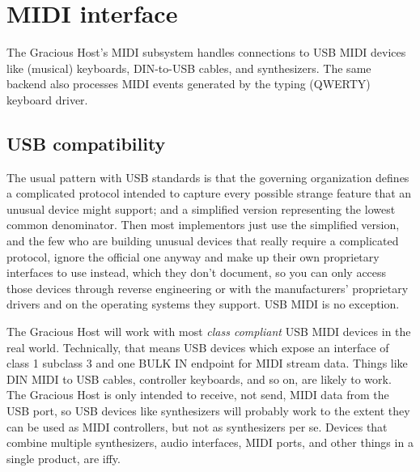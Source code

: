 
%
%
%
%
%
%

\chapter{MIDI interface}

The Gracious Host's MIDI subsystem handles connections to USB MIDI devices
like (musical) keyboards, DIN-to-USB cables, and synthesizers.  The same
backend also processes MIDI events generated by the typing (QWERTY) keyboard
driver.


\section{USB compatibility}

The usual pattern with USB standards is that the governing organization
defines a complicated protocol intended to capture every possible strange
feature that an unusual device might support; and a simplified version
representing the lowest common denominator.  Then most implementors just use
the simplified version, and the few who are building unusual devices that
really require a complicated protocol, ignore the official one anyway and
make up their own proprietary interfaces to use instead, which they don't
document, so you can only access those devices through reverse engineering
or with the manufacturers' proprietary drivers and on the operating systems
they support.  USB MIDI is no exception.

The Gracious Host will work with most \emph{class compliant} USB MIDI
devices in the real world.  Technically, that means USB devices which expose
an interface of class 1 subclass 3 and one BULK IN endpoint for MIDI stream
data.  Things like DIN MIDI to USB cables, controller keyboards, and so on,
are likely to work.  The Gracious Host is only intended to receive, not
send, MIDI data from the USB port, so USB devices like synthesizers will
probably work to the extent they can be used as MIDI controllers, but not as
synthesizers per se.  Devices that combine multiple
synthesizers, audio interfaces, MIDI ports, and other things in a single
product, are iffy.

